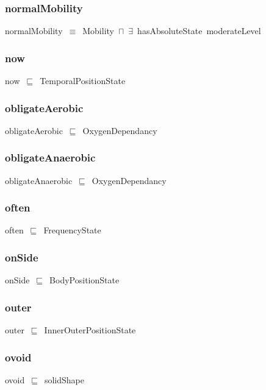 \documentclass{article}
\begin{document}
\subsubsection*{normalMobility}

normalMobility~\ensuremath{\equiv}~Mobility~\ensuremath{\sqcap}~\ensuremath{\exists}~hasAbsoluteState~moderateLevel

\subsubsection*{now}

now~\ensuremath{\sqsubseteq}~TemporalPositionState~

\subsubsection*{obligateAerobic}

obligateAerobic~\ensuremath{\sqsubseteq}~OxygenDependancy~

\subsubsection*{obligateAnaerobic}

obligateAnaerobic~\ensuremath{\sqsubseteq}~OxygenDependancy~

\subsubsection*{often}

often~\ensuremath{\sqsubseteq}~FrequencyState~

\subsubsection*{onSide}

onSide~\ensuremath{\sqsubseteq}~BodyPositionState~

\subsubsection*{outer}

outer~\ensuremath{\sqsubseteq}~InnerOuterPositionState~

\subsubsection*{ovoid}

ovoid~\ensuremath{\sqsubseteq}~solidShape~
\end{document}

